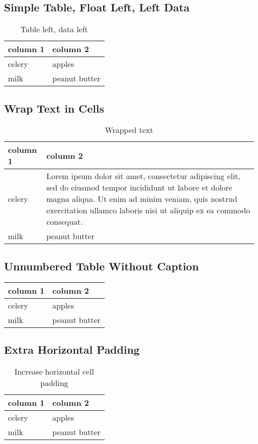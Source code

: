 \documentclass[]{scrartcl}
\begin{document}
\subsection{Simple Table, Float Left, Left Data}

\begin{table}[h!]
	\begin{tabular}{ll}
		column 1 & column 2 \\
		\hline
		celery & apples \\
		milk & peanut butter 
	\end{tabular}
	\caption{Table left, data left}\label{tab:left-left}
\end{table}

\subsection{Wrap Text in Cells}

\begin{table}[h!]
	\centering
	\begin{tabular}{lp{}}
		column 1 & column 2 \\
		\hline
		celery & Lorem ipsum dolor sit amet, consectetur adipiscing elit, sed do eiusmod tempor incididunt ut labore et dolore magna aliqua. Ut enim ad minim veniam, quis nostrud exercitation ullamco laboris nisi ut aliquip ex ea commodo consequat. \\
		milk & peanut butter 
	\end{tabular}
	\caption{Wrapped text}\label{tab:wrapped-text}
\end{table}

\subsection{Unnumbered Table Without Caption}

\begin{center}
\begin{tabular}{ll}
	column 1 & column 2 \\
	\hline
	celery & apples \\
	milk & peanut butter 
\end{tabular}
\end{center}

\subsection{Extra Horizontal Padding}

\begin{table}[h!]
	\centering
	\setlength{\tabcolsep}{3.5em}
	\begin{tabular}{ll}
		column 1 & column 2 \\
		\hline
		celery & apples \\
		milk & peanut butter 
	\end{tabular}
	\caption{Increase horizontal cell padding}\label{tab:horiz-padding}
\end{table}
\end{document}
